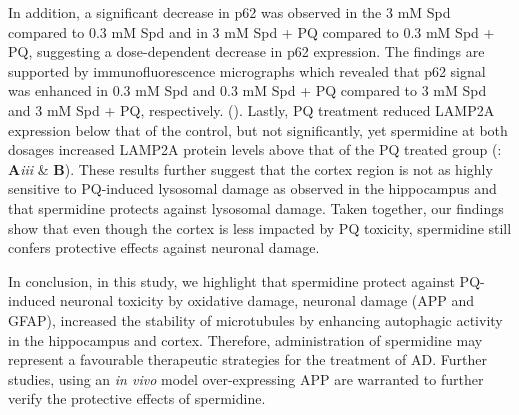 In addition, a significant decrease in p62 was observed in the 3 mM Spd compared to 0.3 mM Spd  and in 3 mM Spd + PQ compared to 0.3 mM Spd + PQ, suggesting a dose-dependent decrease in p62 expression. The findings are supported by immunofluorescence micrographs which revealed that p62 signal was enhanced in 0.3 mM Spd and 0.3 mM Spd + PQ compared to 3 mM Spd and 3 mM Spd + PQ, respectively.
(). Lastly, PQ treatment reduced LAMP2A expression below that of the control, but not significantly, yet spermidine at both dosages increased LAMP2A protein levels above that of the PQ treated group (: \textbf{A}\textit{iii} \& \textbf{B}). These results further suggest that the cortex region is not as highly sensitive to PQ-induced lysosomal damage as observed in the hippocampus and that spermidine protects against lysosomal damage. Taken together, our findings show that even though the cortex is less impacted by PQ toxicity, spermidine still confers protective effects against neuronal damage.  

In conclusion, in this study, we highlight that spermidine protect against PQ-induced neuronal toxicity by oxidative damage, neuronal damage (APP and GFAP), increased the stability of microtubules by enhancing autophagic activity in the hippocampus and cortex. Therefore, administration of spermidine may represent a favourable therapeutic strategies for the treatment of AD. Further studies, using an \textit{in vivo} model over-expressing APP are warranted to further verify the protective effects of spermidine.